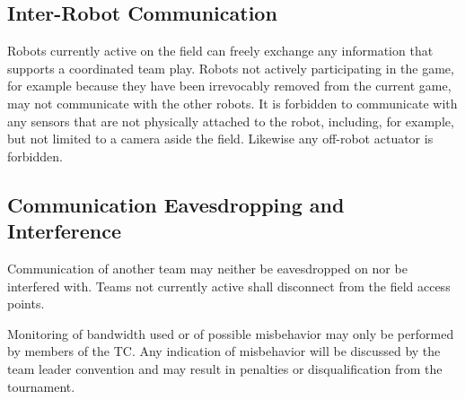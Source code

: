 \documentclass[12pt,twoside]{article}
\newenvironment{rulechange}{}{}
\begin{document}
\subsection{Inter-Robot Communication}
\label{sec:inter-robot-comm}
Robots currently active on the field can freely exchange any
information that supports a coordinated team play. Robots not actively
participating in the game, for example because they have been
irrevocably removed from the current game, may not communicate with
the other robots. It is forbidden to communicate with any sensors that
are not physically attached to the robot, including, for example, but
not limited to a camera aside the field. Likewise any off-robot
actuator is forbidden.

\subsection{Communication Eavesdropping and Interference}
\label{sec:comm-tampering}
Communication of another team may neither be eavesdropped on nor be
interfered with. Teams not currently active shall disconnect from the
field access points.

Monitoring of bandwidth used or of possible misbehavior may only be
performed by members of the TC.
Any indication of misbehavior will be discussed by the team leader
convention and may result in penalties or disqualification from the
tournament.


\end{document}
